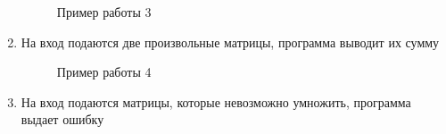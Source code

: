 \documentclass[12pt, a4paper]{article}
\begin{document}
\begin{enumerate}
\begin{figure}[h]
  		\caption{Пример работы 3}
	\end{figure}
	\newpage
	\item На вход подаются две произвольные матрицы, программа выводит их сумму	
	\begin{figure}[h]
  		\caption{Пример работы 4}
	\end{figure}
	\newpage
	\item На вход подаются матрицы, которые невозможно 
	умножить, программа выдает ошибку
	\begin{figure}[h]

\end{figure}
\end{enumerate}
\end{document}
